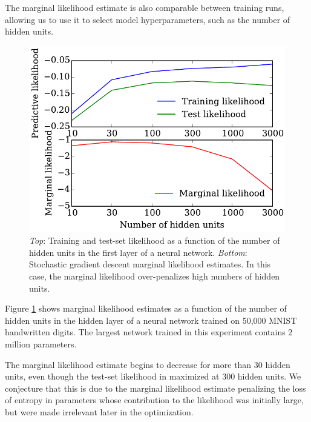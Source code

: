 \documentclass[]{article}
\begin{document}

The marginal likelihood estimate is also comparable between training runs, allowing us to use it to select model hyperparameters, such as the number of hidden units.

\begin{figure}[h!]
\begin{center}
\includegraphics[width=\columnwidth]{../experiments/2015_03_03_vary_width/7_hidden_units_higher_learnrate/vary_widths.pdf}
\vskip -0.1in
\caption{\emph{Top}: Training and test-set likelihood as a function of the number of hidden units in the first layer of a neural network.
\emph{Bottom}: Stochastic gradient descent marginal likelihood estimates.
In this case, the marginal likelihood over-penalizes high numbers of hidden units. 
}
\label{fig:num hiddens}
\end{center}
\end{figure}

Figure \ref{fig:num hiddens} shows marginal likelihood estimates as a function of the number of hidden units in the hidden layer of a neural network trained on 50,000 MNIST handwritten digits.
The largest network trained in this experiment contains 2 million parameters.

The marginal likelihood estimate begins to decrease for more than 30 hidden units, even though the test-set likelihood in maximized at 300 hidden units.
We conjecture that this is due to the marginal likelihood estimate penalizing the loss of entropy in parameters whose contribution to the likelihood was initially large, but were made irrelevant later in the optimization.
\end{document}
